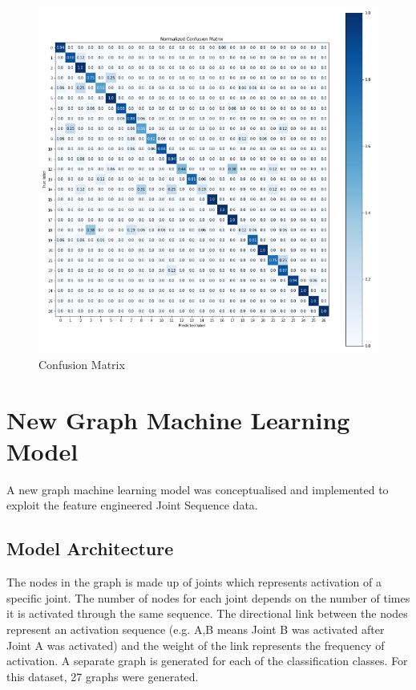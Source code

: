 \documentclass[conference]{IEEEtran}
\begin{document}
\begin{figure}[H]
\begin{center}
\includegraphics[scale=0.6]{Image/LSTM_Confusion_Matrix.png}
\caption{\label{fig:LSTM_Confusion_Matrix} Confusion Matrix}
\end{center}
\end{figure}
 
\section{New Graph Machine Learning Model}

A new graph machine learning model was conceptualised and implemented to exploit the feature engineered Joint Sequence data. 
\subsection{Model Architecture}

The nodes in the graph is made up of joints which represents activation of a specific joint. The number of nodes for each joint depends on the number of times it is activated through the same sequence. The directional link between the nodes represent an activation sequence (e.g. A,B means Joint B was activated after Joint A was activated) and the weight of the link represents the frequency of activation. A separate graph is generated for each of the classification classes. For this dataset, 27 graphs were generated. 
\end{document}
